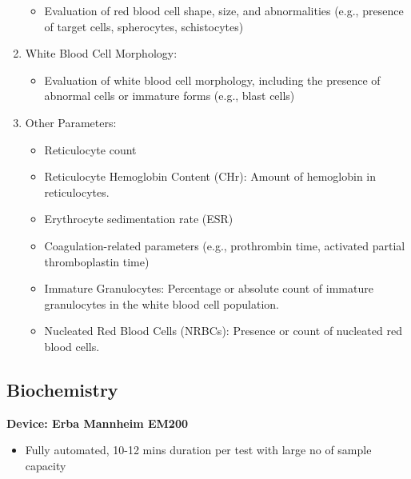 \documentclass[
  11pt,
  letterpaper,
  DIV=11,
  numbers=noendperiod]{scrreprt}
\providecommand{\tightlist}{%
  \setlength{\itemsep}{0pt}\setlength{\parskip}{0pt}}\usepackage{longtable,booktabs,array}
\begin{document}
\begin{enumerate}
  \begin{itemize}
  \tightlist
  \item
    Evaluation of red blood cell shape, size, and abnormalities (e.g.,
    presence of target cells, spherocytes, schistocytes)
  \end{itemize}
\item
  White Blood Cell Morphology:

  \begin{itemize}
  \tightlist
  \item
    Evaluation of white blood cell morphology, including the presence of
    abnormal cells or immature forms (e.g., blast cells)
  \end{itemize}
\item
  Other Parameters:

  \begin{itemize}
  \tightlist
  \item
    Reticulocyte count
  \item
    Reticulocyte Hemoglobin Content (CHr): Amount of hemoglobin in
    reticulocytes.
  \item
    Erythrocyte sedimentation rate (ESR)
  \item
    Coagulation-related parameters (e.g., prothrombin time, activated
    partial thromboplastin time)
  \item
    Immature Granulocytes: Percentage or absolute count of immature
    granulocytes in the white blood cell population.
  \item
    Nucleated Red Blood Cells (NRBCs): Presence or count of nucleated
    red blood cells.
  \end{itemize}
\end{enumerate}

\subsection{Biochemistry}\label{biochemistry}

\textbf{Device: Erba Mannheim EM200}

\begin{itemize}
\tightlist
\item
  Fully automated, 10-12 mins duration per test with large no of sample
  capacity
\end{itemize}
\end{document}
